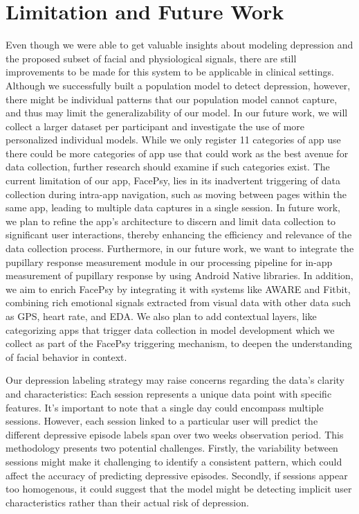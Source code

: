 \section{Limitation and Future Work}
Even though we were able to get valuable insights about modeling depression and the proposed subset of facial and physiological signals, there are still improvements to be made for this system to be applicable in clinical settings. Although we successfully built a population model to detect depression, however, there might be individual patterns that our population model cannot capture, and thus may limit the generalizability of our model. In our future work, we will collect a larger dataset per participant and investigate the use of more personalized individual models. While we only register 11 categories of app use there could be more categories of app use that could work as the best avenue for data collection, further research should examine if such categories exist. The current limitation of our app, FacePsy, lies in its inadvertent triggering of data collection during intra-app navigation, such as moving between pages within the same app, leading to multiple data captures in a single session. In future work, we plan to refine the app's architecture to discern and limit data collection to significant user interactions, thereby enhancing the efficiency and relevance of the data collection process. Furthermore, in our future work, we want to integrate the pupillary response measurement module \cite{islam2024pupilsense} in our processing pipeline for in-app measurement of pupillary response by using Android Native libraries. In addition, we aim to enrich FacePsy by integrating it with systems like AWARE and Fitbit, combining rich emotional signals extracted from visual data with other data such as GPS, heart rate, and EDA. We also plan to add contextual layers, like categorizing apps that trigger data collection in model development which we collect as part of the FacePsy triggering mechanism, to deepen the understanding of facial behavior in context.



Our depression labeling strategy may raise concerns regarding the data's clarity and characteristics: Each session represents a unique data point with specific features. It's important to note that a single day could encompass multiple sessions. However, each session linked to a particular user will predict the different depressive episode labels span over two weeks observation period. This methodology presents two potential challenges. Firstly, the variability between sessions might make it challenging to identify a consistent pattern, which could affect the accuracy of predicting depressive episodes. Secondly, if sessions appear too homogenous, it could suggest that the model might be detecting implicit user characteristics rather than their actual risk of depression.







